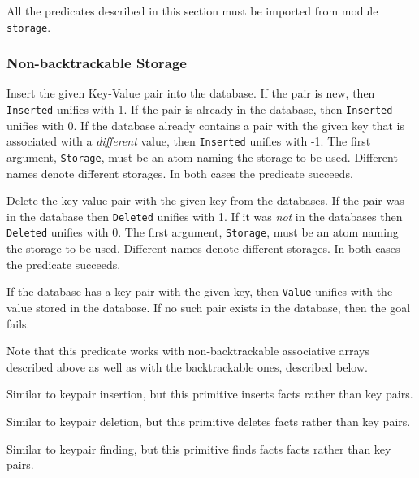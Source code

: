 All the predicates described in this section must be imported from
module {\tt storage}.

\subsubsection{Non-backtrackable Storage}

\begin{description}
Insert the given Key-Value pair into the database. If the pair is new, then
{\tt Inserted} unifies with 1. If the pair is already in the database, then
{\tt Inserted} unifies with 0. If the database already contains a pair with
the given key that is associated with a \emph{different} value, then
{\tt Inserted} unifies with -1.
The first argument, {\tt Storage}, must be an atom naming the storage to be
used. Different names denote different storages.
In both cases the predicate succeeds.

Delete the key-value pair with the given key from the databases. If
the pair was in the database then {\tt Deleted} unifies with 1.
If it was \emph{not} in the databases then {\tt Deleted} unifies with 0.
The first argument, {\tt Storage}, must be an atom naming the storage to be
used. Different names denote different storages.
In both cases the predicate succeeds.

If the database has a key pair with the given key, then {\tt Value} unifies
with the value stored in the database. If no such pair exists in the
database, then the goal fails.

Note that this predicate works with non-backtrackable associative arrays
described above as well as with the backtrackable ones, described below.

Similar to keypair insertion, but this primitive inserts facts rather than
key pairs.

Similar to keypair deletion, but this primitive deletes facts rather than
key pairs.

Similar to keypair finding, but this primitive finds facts facts rather than
key pairs.
\end{description}

